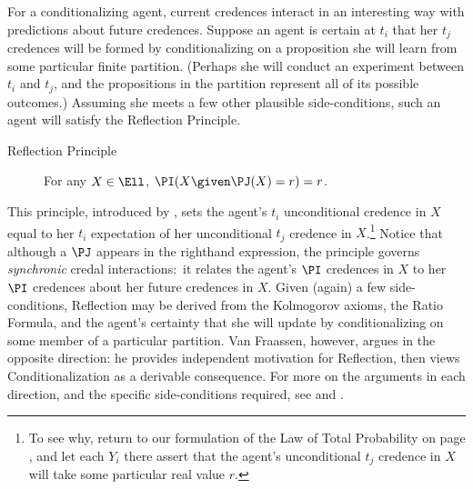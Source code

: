 For a conditionalizing agent, current credences interact in an interesting way with predictions about future credences. Suppose an agent is certain at $t_i$ that her $t_j$ credences will be formed by conditionalizing on a proposition she will learn from some particular finite partition. (Perhaps she will conduct an experiment between $t_i$ and $t_j$, and the propositions in the partition represent all of its possible outcomes.) Assuming she meets a few other plausible side-conditions, such an agent will satisfy the Reflection Principle.
\begin{description}
\item[Reflection Principle]{For any $X \in \Ell$, $\PI(X \given \PJ(X)=r)=r$.} 
\end{description}
This principle, introduced by \citet{vanFraassenWill}, sets the agent's $t_i$ unconditional credence in $X$ equal to her $t_i$ expectation of her unconditional $t_j$ credence in $X$.\footnote
{To see why, return to our formulation of the Law of Total Probability on page \pageref{p:LTP}, and let each $Y_i$ there assert that the agent's unconditional $t_j$ credence in $X$ will take some particular real value $r$.}
 Notice that although a $\PJ$ appears in the righthand expression, the principle governs \emph{synchronic} credal interactions:\ it relates the agent's $\PI$ credences in $X$ to her $\PI$ credences about her future credences in $X$. Given (again) a few side-conditions, Reflection may be derived from the Kolmogorov axioms, the Ratio Formula, and the agent's certainty that she will update by conditionalizing on some member of a particular partition. Van Fraassen, however, argues in the opposite direction: he provides independent motivation for Reflection, then views Conditionalization as a derivable consequence. For more on the arguments in each direction, and the specific side-conditions required, see \citet{WeisbergConditionalization} and \citet{BriggsDistorted}.

